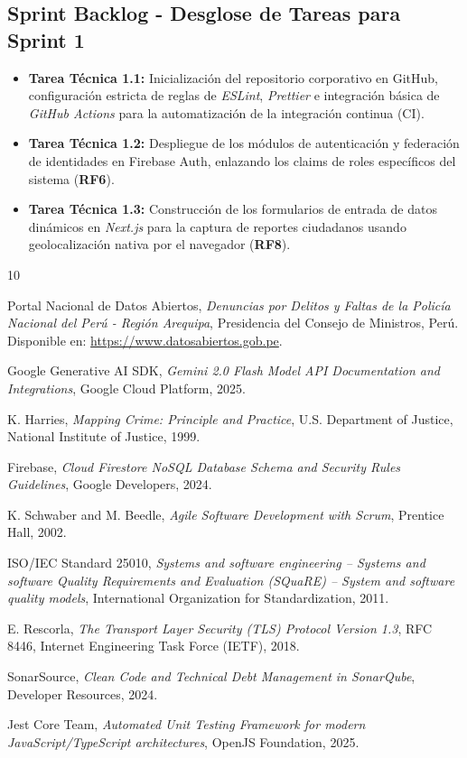 \documentclass[conference]{IEEEtran}
\begin{document}
\subsection{Sprint Backlog - Desglose de Tareas para Sprint 1}
\begin{itemize}
    \item \textbf{Tarea Técnica 1.1:} Inicialización del repositorio corporativo en GitHub, configuración estricta de reglas de \textit{ESLint}, \textit{Prettier} e integración básica de \textit{GitHub Actions} para la automatización de la integración continua (CI).
    \item \textbf{Tarea Técnica 1.2:} Despliegue de los módulos de autenticación y federación de identidades en Firebase Auth, enlazando los claims de roles específicos del sistema (\textbf{RF6}).
    \item \textbf{Tarea Técnica 1.3:} Construcción de los formularios de entrada de datos dinámicos en \textit{Next.js} para la captura de reportes ciudadanos usando geolocalización nativa por el navegador (\textbf{RF8}).
\end{itemize}

\begin{thebibliography}{10}

Portal Nacional de Datos Abiertos,
\emph{Denuncias por Delitos y Faltas de la Policía Nacional del Perú - Región Arequipa},
Presidencia del Consejo de Ministros, Perú.
Disponible en: \url{https://www.datosabiertos.gob.pe}.

Google Generative AI SDK,
\emph{Gemini 2.0 Flash Model API Documentation and Integrations},
Google Cloud Platform, 2025.

K. Harries,
\emph{Mapping Crime: Principle and Practice},
U.S. Department of Justice, National Institute of Justice, 1999.

Firebase,
\emph{Cloud Firestore NoSQL Database Schema and Security Rules Guidelines},
Google Developers, 2024.

K. Schwaber and M. Beedle,
\emph{Agile Software Development with Scrum},
Prentice Hall, 2002.

ISO/IEC Standard 25010,
\emph{Systems and software engineering -- Systems and software Quality Requirements and Evaluation (SQuaRE) -- System and software quality models},
International Organization for Standardization, 2011.

E. Rescorla,
\emph{The Transport Layer Security (TLS) Protocol Version 1.3},
RFC 8446, Internet Engineering Task Force (IETF), 2018.

SonarSource,
\emph{Clean Code and Technical Debt Management in SonarQube},
Developer Resources, 2024.

Jest Core Team,
\emph{Automated Unit Testing Framework for modern JavaScript/TypeScript architectures},
OpenJS Foundation, 2025.

\end{thebibliography}
\end{document}
